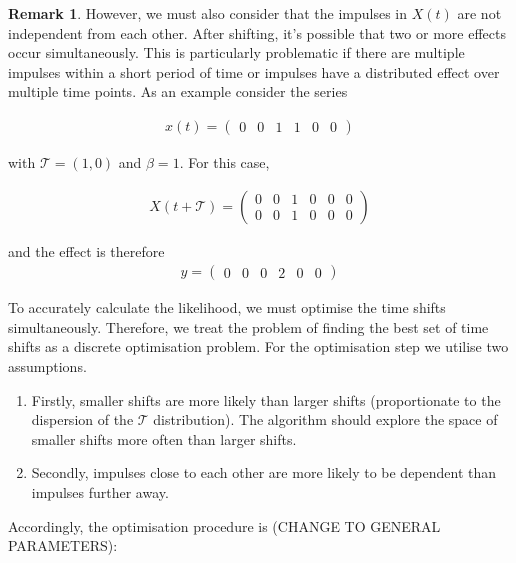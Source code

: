 \documentclass[11pt]{amsart}
\theoremstyle{definition}
\theoremstyle{definition}
\newtheorem*{remark}{Remark}
\begin{document}
\begin{remark}
However, we must also consider that the impulses in $X(t)$ are not independent from each other. After shifting, it's possible that two or more effects occur simultaneously. This is particularly problematic if there are multiple impulses within a short period of time or impulses have a distributed effect over multiple time points. As an example consider the series 

\begin{align*}
x(t) = 
\left(
\begin{array}{cccccc}
0 & 0 & 1 & 1 & 0 & 0
\end{array}  
\right)
\end{align*}

with $\mathcal{T}= (1, 0)$ and $\beta = 1$. For this case, 

\begin{align*}
X(t + \mathcal{T}) = 
\left(
\begin{array}{cccccc}
0 & 0 & 1 & 0 & 0 & 0 \\
0 & 0 & 1 & 0 & 0 & 0 
\end{array}  
\right)
\end{align*}

and the effect is therefore 
\begin{align*}
y = 
\left(
\begin{array}{cccccc}
0 & 0 & 0 & 2 & 0 & 0
\end{array}  
\right)
\end{align*}
\end{remark}

To accurately calculate the likelihood, we must optimise the time shifts simultaneously. Therefore, we treat the problem of finding the best set of time shifts as a discrete optimisation problem. For the optimisation step we utilise two assumptions.

\begin{enumerate}
\item Firstly, smaller shifts are more likely than larger shifts (proportionate to the dispersion of the $\mathcal{T}$ distribution). The algorithm should explore the space of smaller shifts more often than larger shifts. 
\item Secondly, impulses close to each other are more likely to be dependent than impulses further away. 
\end{enumerate}


Accordingly, the optimisation procedure is (CHANGE TO GENERAL PARAMETERS):
\end{document}
